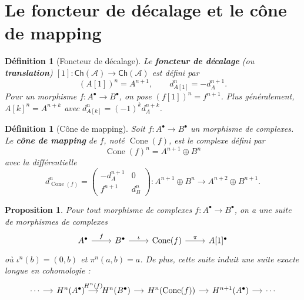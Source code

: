 \documentclass[a4paper,12pt]{book}
\newtheorem{proposition}[theoreme]{Proposition}
\newtheorem{definition}[theoreme]{Définition}
\begin{document}
\section{Le foncteur de décalage et le cône de mapping}%
\label{sec:shift-cone}

\begin{definition}[Foncteur de décalage]\label{def:shift-functor}
Le \textbf{foncteur de décalage} (ou \textbf{translation})
$[1] \colon \mathsf{Ch}(\mathcal{A}) \to \mathsf{Ch}(\mathcal{A})$
est défini par
\[
  (A[1])^n = A^{n+1}, \qquad d_{A[1]}^n = -d_A^{n+1}.
\]
Pour un morphisme $f \colon A^\bullet \to B^\bullet$, on pose
$(f[1])^n = f^{n+1}$. Plus généralement, $A[k]^n = A^{n+k}$ avec
$d_{A[k]}^n = (-1)^k d_A^{n+k}$.
\end{definition}

\begin{definition}[Cône de mapping]\label{def:mapping-cone}
Soit $f \colon A^\bullet \to B^\bullet$ un morphisme de complexes.
Le \textbf{cône de mapping} de $f$, noté $\operatorname{Cone}(f)$,
est le complexe défini par
\[
  \operatorname{Cone}(f)^n = A^{n+1} \oplus B^n
\]
avec la différentielle
\[
  d_{\operatorname{Cone}(f)}^n =
  \begin{pmatrix} -d_A^{n+1} & 0 \\ f^{n+1} & d_B^n \end{pmatrix}
  \colon A^{n+1} \oplus B^n \longrightarrow A^{n+2} \oplus B^{n+1}.
\]
\end{definition}

\begin{proposition}\label{prop:cone-exact-triangle}
Pour tout morphisme de complexes $f \colon A^\bullet \to B^\bullet$,
on a une suite de morphismes de complexes
\[
\begin{tikzcd}
A^\bullet \arrow[r, "f"] & B^\bullet \arrow[r, "\iota"]
  & \operatorname{Cone}(f) \arrow[r, "\pi"] & A[1]^\bullet
\end{tikzcd}
\]
où $\iota^n(b) = (0, b)$ et $\pi^n(a, b) = a$. De plus, cette suite
induit une suite exacte longue en cohomologie :
\[
\begin{tikzcd}[column sep=small]
\cdots \arrow[r]
& H^n(A^\bullet) \arrow[r, "H^n(f)"]
& H^n(B^\bullet) \arrow[r]
& H^n(\operatorname{Cone}(f)) \arrow[r]
& H^{n+1}(A^\bullet) \arrow[r]
& \cdots
\end{tikzcd}
\]
\end{proposition}
\end{document}
